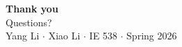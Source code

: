 \documentclass[10pt,aspectratio=169]{beamer}
\begin{document}
{
\begin{frame}[plain]
\vfill
\begin{center}
{\Huge\color{PurdueGold}\textbf{Thank you}}\\[10pt]
{\large\color{white} Questions?}\\[30pt]
{\footnotesize\color{PurdueGold} Yang Li \quad $\cdot$ \quad Xiao Li \quad $\cdot$ \quad IE 538 $\cdot$ Spring 2026}
\end{center}
\vfill
\end{frame}
}


\end{document}

